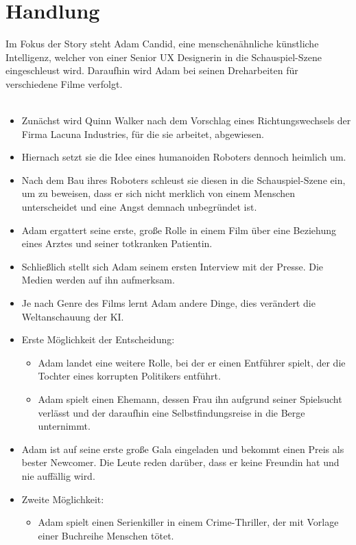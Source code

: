 \section{Handlung}
Im Fokus der Story steht Adam Candid, eine menschenähnliche künstliche Intelligenz, welcher von einer Senior UX Designerin in die Schauspiel-Szene eingeschleust wird. Daraufhin wird Adam bei seinen Dreharbeiten für verschiedene Filme verfolgt.\\
\\
\begin{itemize}
\item Zunächst wird Quinn Walker nach dem Vorschlag eines Richtungswechsels der Firma Lacuna Industries, für die sie arbeitet, abgewiesen.
\item Hiernach setzt sie die Idee eines humanoiden Roboters dennoch heimlich um.
\item Nach dem Bau ihres Roboters schleust sie diesen in die Schauspiel-Szene ein, um zu beweisen, dass er sich nicht merklich von einem Menschen unterscheidet und eine Angst demnach unbegründet ist.
\item Adam ergattert seine erste, große Rolle in einem Film über eine Beziehung eines Arztes und seiner totkranken Patientin.
\item Schließlich stellt sich Adam seinem ersten Interview mit der Presse. Die Medien werden auf ihn aufmerksam.
\item Je nach Genre des Films lernt Adam andere Dinge, dies verändert die Weltanschauung der KI.\newpage
\item Erste Möglichkeit der Entscheidung: 
\begin{itemize}
\item Adam landet eine weitere Rolle, bei der er einen Entführer spielt, der die Tochter eines korrupten Politikers entführt.
\item Adam spielt einen Ehemann, dessen Frau ihn aufgrund seiner Spielsucht verlässt und der daraufhin eine Selbstfindungsreise in die Berge unternimmt.
\end{itemize}
\item Adam ist auf seine erste große Gala eingeladen und bekommt einen Preis als bester Newcomer. Die Leute reden darüber, dass er keine Freundin hat und nie auffällig wird.
\item Zweite Möglichkeit:
\begin{itemize}
\item Adam spielt einen Serienkiller in einem Crime-Thriller, der mit Vorlage einer Buchreihe Menschen tötet.

\end{itemize}
\end{itemize}
